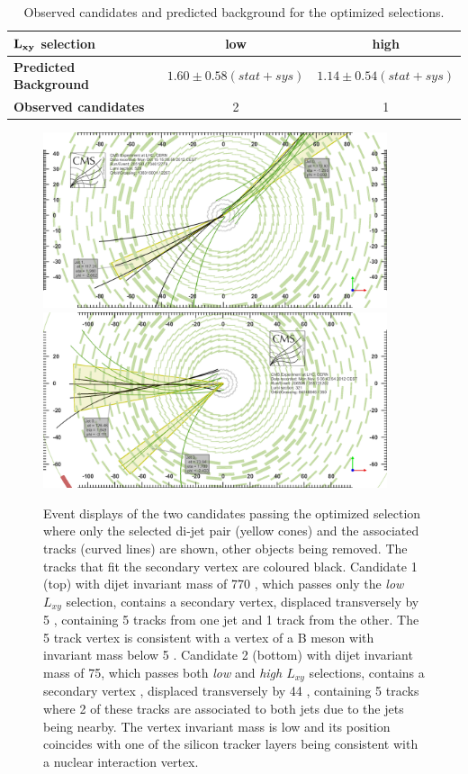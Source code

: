 \begin{table}[htbp]
\centering
\begin{tabular}{|l|c|c|}
\hline
$\bf L_{xy}$ \bf selection & \bf low & \bf high \\
\hline
\bf Predicted Background & $ 1.60\pm0.58(stat+sys)$ & $ 1.14\pm0.54(stat+sys)$ \\
\hline
\bf Observed candidates & 2 & 1 \\ 
\hline
\end{tabular}
\caption{Observed candidates and predicted background for the optimized selections.\label{tab:fullunblinding}}
\end{table}

\begin{figure}
\centering
\includegraphics[width=0.9\textwidth]{plots/displays/candidate1_display.png}
\includegraphics[width=0.9\textwidth]{plots/displays/candidate2_display.png}

\caption{Event displays of the two candidates passing the optimized selection where only the selected di-jet pair
 (yellow cones) and 
the associated tracks (curved lines) are shown, other objects being removed. The tracks that fit the secondary 
vertex are coloured black.  
Candidate 1 (top) with dijet invariant mass of 770 \GeV, which 
passes only the {\it low $L_{xy}$} selection, 
contains a secondary vertex, displaced transversely by 5 \cm, containing 5 tracks from one jet and 1 track
from the other. The 5 track vertex is consistent with a vertex of a B meson with invariant mass below 5 \GeV.
Candidate 2 (bottom) with dijet invariant mass of 75\GeV, 
which passes both {\it low} and {\it high $L_{xy}$} selections, contains a secondary vertex
, displaced transversely by 44 \cm, containing 5 tracks where 2 of these tracks are
associated to both jets due to the jets being nearby. The vertex invariant mass is low and its position
 coincides with one of the silicon 
tracker layers being consistent with a nuclear interaction vertex. \label{fig:eventDisplays}}
\end{figure} 



